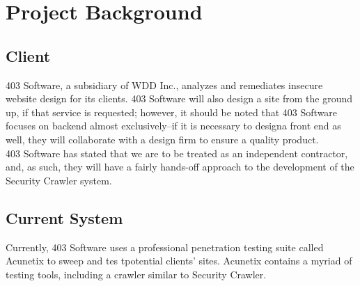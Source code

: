 \section{Project Background}
\subsection{Client}
	403 Software, a subsidiary of WDD Inc., analyzes and remediates insecure website design for its clients.  403 Software will also design a site from the ground up, if that service is requested; however, it should be noted that 403 Software focuses on backend almost exclusively--if it is necessary to designa  front end as well, they will collaborate with a design firm to ensure a quality product. \\
403 Software has stated that we are to be treated as an independent contractor, and, as such, they will have a fairly hands-off approach to the development of the Security Crawler system.

\subsection{Current System}

	Currently, 403 Software uses a professional penetration testing suite called Acunetix to sweep and tes tpotential clients' sites.  Acunetix contains a myriad of testing tools, including a crawler similar to Security Crawler.

